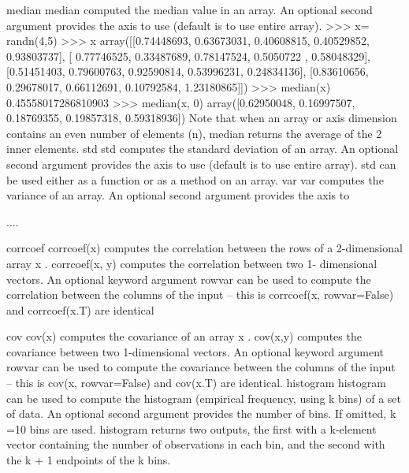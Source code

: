 


median
median computed the median value in an array. An optional second argument provides the axis to use
(default is to use entire array).
>>> x= randn(4,5)
>>> x
array([[0.74448693,
0.63673031,
0.40608815,
0.40529852, 0.93803737],
[ 0.77746525, 0.33487689, 0.78147524, 0.5050722
, 0.58048329],
[0.51451403,
0.79600763,
0.92590814, 0.53996231,
0.24834136],
[0.83610656,
0.29678017, 0.66112691,
0.10792584, 1.23180865]])
>>> median(x)
0.45558017286810903
>>> median(x, 0)
array([0.62950048,
0.16997507,
0.18769355, 0.19857318,
0.59318936])
Note that when an array or axis dimension contains an even number of elements (n), median returns the
average of the 2 inner elements.
std
std computes the standard deviation of an array. An optional second argument provides the axis to use
(default is to use entire array). std can be used either as a function or as a method on an array.
var
var computes the variance of an array. An optional second argument provides the axis to

....

corrcoef
corrcoef(x) computes the correlation between the rows of a 2-dimensional array x . corrcoef(x, y) computes
the correlation between two 1- dimensional vectors. An optional keyword argument rowvar can be
used to compute the correlation between the columns of the input – this is corrcoef(x, rowvar=False)
and corrcoef(x.T) are identical



cov
cov(x) computes the covariance of an array x . cov(x,y) computes the covariance between two 1-dimensional
vectors. An optional keyword argument rowvar can be used to compute the covariance between the
columns of the input – this is cov(x, rowvar=False) and cov(x.T) are identical.
histogram
histogram can be used to compute the histogram (empirical frequency, using k bins) of a set of data. An
optional second argument provides the number of bins. If omitted, k =10 bins are used. histogram returns
two outputs, the first with a k-element vector containing the number of observations in each bin, and the
second with the k + 1 endpoints of the k bins.

